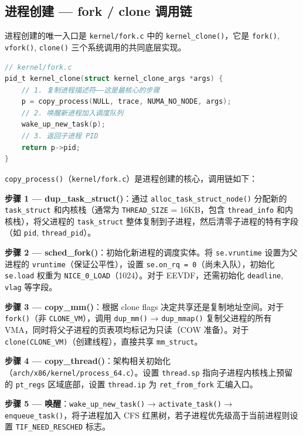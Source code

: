 \documentclass[a4paper]{article}
\begin{document}
\subsection{进程创建 — fork / clone 调用链}

进程创建的唯一入口是 \texttt{kernel/fork.c} 中的 \texttt{kernel\_clone()}，它是 \texttt{fork()}, \texttt{vfork()}, \texttt{clone()} 三个系统调用的共同底层实现\cite{stevens}。

\begin{lstlisting}[language=C, caption={kernel\_clone 核心流程}, label={lst:fork}]
// kernel/fork.c
pid_t kernel_clone(struct kernel_clone_args *args) {
    // 1. 复制进程描述符——这是最核心的步骤
    p = copy_process(NULL, trace, NUMA_NO_NODE, args);
    // 2. 唤醒新进程加入调度队列
    wake_up_new_task(p);
    // 3. 返回子进程 PID
    return p->pid;
}
\end{lstlisting}

\texttt{copy\_process()}（\texttt{kernel/fork.c}）是进程创建的核心，调用链如下：

\textbf{步骤 1 — dup\_task\_struct()}：通过 \texttt{alloc\_task\_struct\_node()} 分配新的 \texttt{task\_struct} 和内核栈（通常为 \texttt{THREAD\_SIZE} = 16KB，包含 \texttt{thread\_info} 和内核栈），将父进程的 \texttt{task\_struct} 整体复制到子进程，然后清零子进程的特有字段（如 \texttt{pid}, \texttt{thread\_pid}）。

\textbf{步骤 2 — sched\_fork()}：初始化新进程的调度实体。将 \texttt{se.vruntime} 设置为父进程的 \texttt{vruntime}（保证公平性），设置 \texttt{se.on\_rq = 0}（尚未入队），初始化 \texttt{se.load} 权重为 \texttt{NICE\_0\_LOAD}（1024）。对于 EEVDF，还需初始化 \texttt{deadline}, \texttt{vlag} 等字段。

\textbf{步骤 3 — copy\_mm()}：根据 clone flags 决定共享还是复制地址空间。对于 \texttt{fork()}（非 \texttt{CLONE\_VM}），调用 \texttt{dup\_mm()} → \texttt{dup\_mmap()} 复制父进程的所有 VMA，同时将父子进程的页表项均标记为只读（COW 准备）。对于 \texttt{clone(CLONE\_VM)}（创建线程），直接共享 \texttt{mm\_struct}。

\textbf{步骤 4 — copy\_thread()}：架构相关初始化（\texttt{arch/x86/kernel/process\_64.c}）。设置 \texttt{thread.sp} 指向子进程内核栈上预留的 \texttt{pt\_regs} 区域底部，设置 \texttt{thread.ip} 为 \texttt{ret\_from\_fork} 汇编入口。

\textbf{步骤 5 — 唤醒}：\texttt{wake\_up\_new\_task()} → \texttt{activate\_task()} → \texttt{enqueue\_task()}，将子进程加入 CFS 红黑树，若子进程优先级高于当前进程则设置 \texttt{TIF\_NEED\_RESCHED} 标志。
\end{document}
